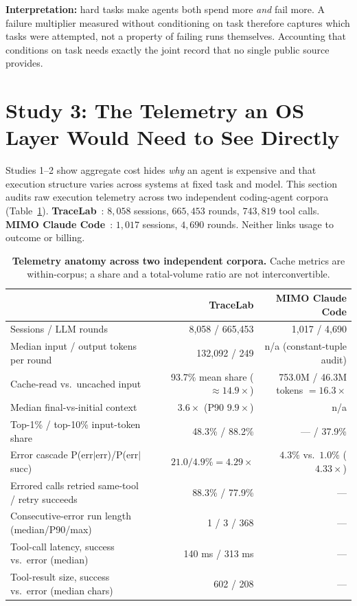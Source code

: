 \documentclass{article}
\begin{document}
\textbf{Interpretation:} hard tasks make agents both spend more \emph{and} fail more. A failure multiplier measured without conditioning on task therefore captures which tasks were attempted, not a property of failing runs themselves. Accounting that conditions on task needs exactly the joint record that no single public source provides.

\section{Study 3: The Telemetry an OS Layer Would Need to See Directly}
\label{sec:telemetry}

Studies 1--2 show aggregate cost hides \emph{why} an agent is expensive and that execution structure varies across systems at fixed task and model. This section audits raw execution telemetry across two independent coding-agent corpora (Table~\ref{tab:anatomy}). \textbf{TraceLab}~\cite{zhu2026tracelab}: $8{,}058$ sessions, $665{,}453$ rounds, $743{,}819$ tool calls. \textbf{MIMO Claude Code}~\cite{zou2026mimo}: $1{,}017$ sessions, $4{,}690$ rounds. Neither links usage to outcome or billing.

\begin{table}[t]
\centering
\caption{\textbf{Telemetry anatomy across two independent corpora.} Cache metrics are within-corpus; a share and a total-volume ratio are not interconvertible.}
\label{tab:anatomy}
\footnotesize\setlength{\tabcolsep}{3pt}
\begin{tabular}{lrr}
\toprule
 & TraceLab & MIMO Claude Code \\
\midrule
Sessions / LLM rounds & 8{,}058 / 665{,}453 & 1{,}017 / 4{,}690 \\
Median input / output tokens per round & 132{,}092 / 249 & n/a (constant-tuple audit) \\
Cache-read vs.\ uncached input & 93.7\% mean share (${\approx}14.9\times$) & 753.0M / 46.3M tokens $=16.3\times$ \\
Median final-vs-initial context & $3.6\times$ (P90 $9.9\times$) & n/a \\
Top-1\% / top-10\% input-token share & 48.3\% / 88.2\% & --- / 37.9\% \\
Error cascade P(err$\mid$err)/P(err$\mid$succ) & $21.0/4.9\% = 4.29\times$ & $4.3\%$ vs.\ $1.0\%$ ($4.33\times$) \\
Errored calls retried same-tool / retry succeeds & 88.3\% / 77.9\% & --- \\
Consecutive-error run length (median/P90/max) & 1 / 3 / 368 & --- \\
Tool-call latency, success vs.\ error (median) & 140 ms / 313 ms & --- \\
Tool-result size, success vs.\ error (median chars) & 602 / 208 & --- \\
\bottomrule
\end{tabular}
\end{table}
\end{document}
